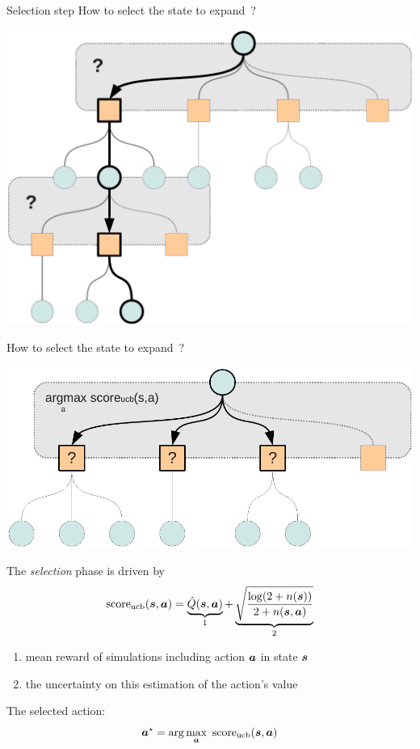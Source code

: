 \begin{frame}{Selection step}
    How to select the state to expand~?
    \begin{center}
        \includegraphics[width=.80\linewidth]{figs/tree3}
    \end{center}
\end{frame}


\begin{frame}{How to select the state to expand~?}
    \begin{center}
        \includegraphics[width=.40\linewidth]{figs/tree4}
    \end{center}
    The {\em selection} phase is driven by \ucb{}%
    $$
    \text{score}_\text{ucb}(\boldsymbol{s}, \boldsymbol{a}) = \underbrace{\hat{Q}(\boldsymbol{s},\boldsymbol{a})}_\text{1} + \underbrace{\sqrt{ \frac{\log(2 + n(\boldsymbol{s}))}{2 + n(\boldsymbol{s}, \boldsymbol{a})} }}_\text{2}
    $$
     {
        \begin{enumerate}
            \item mean reward of simulations including action $\boldsymbol{a}$ in state $\boldsymbol{s}$
            \item the uncertainty on this estimation of the action’s value
        \end{enumerate}
    }
     {
        The selected action: $$\boldsymbol{a}^\star = \arg\max_{\boldsymbol{a}} ~ \text{score}_\text{ucb}(\boldsymbol{s}, \boldsymbol{a})$$
        ~\\
    }
    ~\\
\end{frame}


